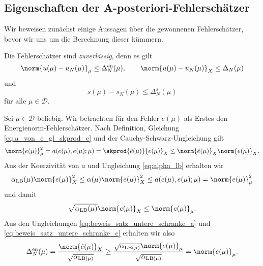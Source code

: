 
\subsection{Eigenschaften der A-posteriori-Fehlerschätzer} %
\label{sub:eigenschaften_der_a_}

Wir beweisen zunächst einige Aussagen über die gewonnenen Fehlerschätzer, bevor wir uns um die Berechnung dieser kümmern.

\begin{Satz}
    Die Fehlerschätzer sind \emph{zuverlässig}, denn es gilt
    \begin{equation}
        \norm{u(\mu) - u_N(\mu)}_{\mu} \leq \Delta^{\text{en}}_N(\mu),
        \qquad
        \norm{u(\mu) - u_N(\mu)}_X \leq \Delta_N(\mu)
    \end{equation}
    und
    \begin{equation}
        s(\mu) - s_N(\mu) \leq \Delta^s_N(\mu)
    \end{equation}
    für alle $\mu \in \mathcal D$.

    \begin{Beweis}
        Sei $\mu \in \mathcal D$ beliebig.
        Wir betrachten für den Fehler $e(\mu)$ als Erstes den Energienorm-Fehlerschätzer.
        Nach Definition, Gleichung \eqref{eq:a_von_e_gl_skprod_e} und der Cauchy-Schwarz-Ungleichung gilt
        \begin{equation}
            \label{eq:beweis_satz_untere_schranke_a}
            \norm{e(\mu)}_{\mu}^2 = a(e(\mu), e(\mu); \mu) = \skprod{\hat e(\mu)}{e(\mu)}_X \leq \norm{\hat e(\mu)}_X \norm{e(\mu)}_X.
        \end{equation}
        Aus der Koerzivität von $a$ und Ungleichung \eqref{eq:alpha_lb} erhalten wir
        \begin{equation}
            \label{eq:beweis_satz_untere_schranke_b}
            \alpha_{\text{LB}}(\mu) \norm{e(\mu)}^2_X \leq \alpha(\mu) \norm{e(\mu)}^2_X \leq a(e(\mu), e(\mu); \mu) = \norm{e(\mu)}^2_{\mu}
        \end{equation}
        und damit
        \begin{equation}
            \label{eq:beweis_satz_untere_schranke_c}
            \sqrt{\alpha_{\text{LB}}(\mu)} \norm{e(\mu)}_X \leq \norm{e(\mu)}_{\mu}.
        \end{equation}
        Aus den Ungleichungen \eqref{eq:beweis_satz_untere_schranke_a} und \eqref{eq:beweis_satz_untere_schranke_c} erhalten wir also
        \begin{equation}
            \Delta^{\text{en}}_N(\mu)
            =
            \frac{\norm{\hat e(\mu)}_X}{\sqrt{\alpha_{\text{LB}(\mu)}}}
            \geq
            \frac{\sqrt{\alpha_{\text{LB}(\mu)}}\norm{e(\mu)}_{\mu}}{\sqrt{\alpha_{\text{LB}(\mu)}}}
            =
            \norm{e(\mu)}_{\mu}.
        \end{equation}


\end{Beweis}
\end{Satz}
